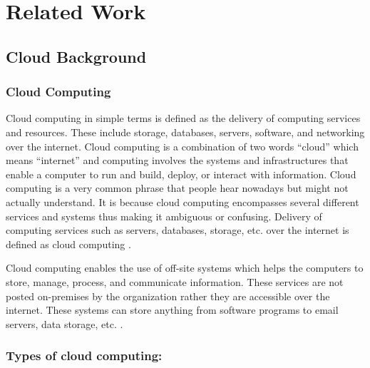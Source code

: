 
\chapter{Related Work}

\section{Cloud Background}

\subsection{Cloud Computing}
Cloud computing in simple terms is defined as the delivery of computing services and resources.
These include
storage, databases, servers, software, and networking over the internet.
Cloud computing is a combination of two
words “cloud” which means “internet” and computing involves the systems and infrastructures that enable a computer to run and build, deploy, or interact with information.
Cloud computing is a very common phrase that people hear nowadays but might not actually understand.
It is because cloud computing encompasses several different services and systems thus making it ambiguous or confusing.
Delivery of computing services such as servers, databases, storage, etc.
over the internet is defined as cloud computing \cite{11}.

Cloud computing enables the use of off-site systems which helps the computers to store, manage, process, and
communicate information.
These services are not posted on-premises by the
organization rather they are accessible over the internet.
These systems can store anything from software programs
to email servers, data storage, etc. \cite{12}.

\subsection{Types of cloud computing:}

